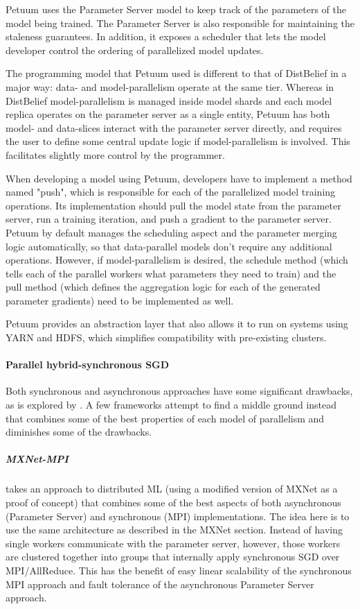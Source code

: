 Petuum uses the Parameter Server model to keep track of the parameters of the model being trained. The Parameter Server is also responsible for maintaining the staleness guarantees. In addition, it exposes a scheduler that lets the model developer control the ordering of parallelized model updates.

The programming model that Petuum used is different to that of DistBelief in a major way: data- and model-parallelism operate at the same tier. Whereas in DistBelief model-parallelism is managed inside model shards and each model replica operates on the parameter server as a single entity, Petuum has both model- and data-slices interact with the parameter server directly, and requires the user to define some central update logic if model-parallelism is involved. This facilitates slightly more control by the programmer.

When developing a model using Petuum, developers have to implement a method named "push", which is responsible for each of the parallelized model training operations. Its implementation should pull the model state from the parameter server, run a training iteration, and push a gradient to the parameter server. Petuum by default manages the scheduling aspect and the parameter merging logic automatically, so that data-parallel models don’t require any additional operations. However, if model-parallelism is desired, the schedule method (which tells each of the parallel workers what parameters they need to train) and the pull method (which defines the aggregation logic for each of the generated parameter gradients) need to be implemented as well.

Petuum provides an abstraction layer that also allows it to run on systems using YARN and HDFS, which simplifies compatibility with pre-existing clusters. 


\paragraph{Parallel hybrid-synchronous SGD}
Both synchronous and asynchronous approaches have some significant drawbacks, as is explored by \citet{ChenJianmin2016}. A few frameworks attempt to find a middle ground instead that combines some of the best properties of each model of parallelism and diminishes some of the drawbacks.

\subparagraph{MXNet-MPI \citep{Mamidala2018}}
takes an approach to distributed ML (using a modified version of MXNet as a proof of concept) that combines some of the best aspects of both asynchronous (Parameter Server) and synchronous (MPI) implementations. The idea here is to use the same architecture as described in the MXNet section. Instead of having single workers communicate with the parameter server, however, those workers are clustered together into groups that internally apply synchronous SGD over MPI/AllReduce. This has the benefit of easy linear scalability of the synchronous MPI approach and fault tolerance of the asynchronous Parameter Server approach.



